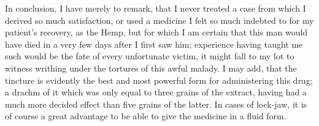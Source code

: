 \documentclass[a4paper, 11pt, oneside, polutonikogreek, english]{article}
\begin{document}
In conclusion, I have merely to remark, that I never treated a case from which I derived so much satisfaction, or used a medicine I felt so much indebted to for my patient's recovery, as the Hemp, but for which I am certain that this man would have died in a very few days after I first saw him; experience having taught me such would be the fate of every unfortunate victim, it might fall to my lot to witness writhing under the tortures of this awful malady. I may add, that the tincture is evidently the best and most powerful form for administering this drug; a drachm of it which was only equal to three grains of the extract, having had a much more decided effect than five grains of the latter. In cases of lock-jaw, it is of course a great advantage to be able to give the medicine in a fluid form.
\end{document}
